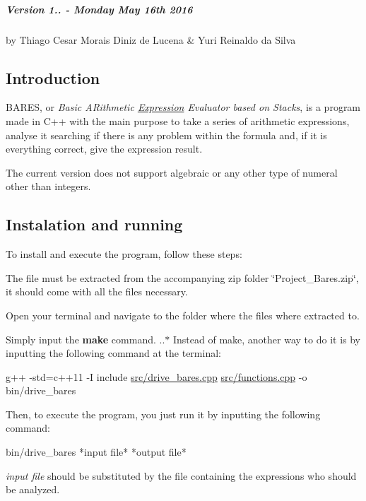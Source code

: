 \subparagraph*{Version 1.. -\/ Monday May 16th 2016}

by Thiago Cesar Morais Diniz de Lucena \& Yuri Reinaldo da Silva

\subsection*{Introduction }

B\+A\+R\+ES, or {\itshape Basic A\+Rithmetic \hyperlink{class_expression}{Expression} Evaluator based on Stacks}, is a program made in C++ with the main purpose to take a series of arithmetic expressions, analyse it searching if there is any problem within the formula and, if it is everything correct, give the expression result.

The current version does not support algebraic or any other type of numeral other than integers.

\subsection*{Instalation and running }

To install and execute the program, follow these steps\+:


\begin{DoxyEnumerate}
\item The file must be extracted from the accompanying zip folder \char`\"{}\+Project\+\_\+\+Bares.\+zip\char`\"{}, it should come with all the files necessary.
\item Open your terminal and navigate to the folder where the files where extracted to.
\item Simply input the {\bfseries make} command. ..$\ast$ Instead of make, another way to do it is by inputting the following command at the terminal\+:
\end{DoxyEnumerate}

g++ -\/std=c++11 -\/I include \hyperlink{drive__bares_8cpp}{src/drive\+\_\+bares.\+cpp} \hyperlink{functions_8cpp}{src/functions.\+cpp} -\/o bin/drive\+\_\+bares

Then, to execute the program, you just run it by inputting the following command\+: \begin{DoxyVerb}bin/drive\_bares *input file* *output file*
\end{DoxyVerb}


{\itshape input file} should be substituted by the file containing the expressions who should be analyzed.

